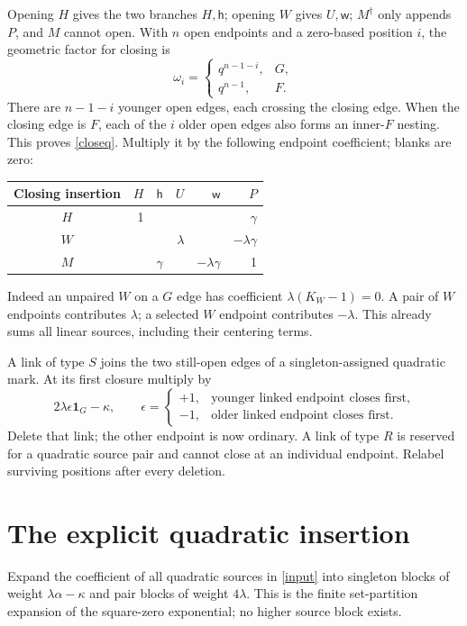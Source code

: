 \documentclass[11pt]{article}
\newcommand{\one}{\mathbf 1}
\begin{document}
Opening $H$ gives the two branches $H,\mathsf h$; opening $W$ gives
$U,\mathsf w$; $M^\dagger$ only appends $P$, and $M$ cannot open.
With $n$ open endpoints and a zero-based position $i$, the geometric
factor for closing is
\begin{equation}\label{closeq}
 \omega_i=\begin{cases}q^{n-1-i},&G,\\q^{n-1},&F.\end{cases}
\end{equation}
There are $n-1-i$ younger open edges, each crossing the closing edge.
When the closing edge is $F$, each of the $i$ older open edges also
forms an inner-$F$ nesting. This proves \eqref{closeq}.
Multiply it by the following endpoint coefficient; blanks are zero:
\begin{center}
\begin{tabular}{c|rrrrr}\toprule
Closing insertion&$H$&$\mathsf h$&$U$&$\mathsf w$&$P$\\\midrule
$H$&1&&&&$\gamma$\\
$W$&&&$\lambda$&&$-\lambda\gamma$\\
$M$&&$\gamma$&&$-\lambda\gamma$&1\\\bottomrule
\end{tabular}
\end{center}
Indeed an unpaired $W$ on a $G$ edge has coefficient
$\lambda(K_W-1)=0$. A pair of $W$ endpoints contributes $\lambda$;
a selected $W$ endpoint contributes $-\lambda$. This already sums
all linear sources, including their centering terms.

A link of type $S$ joins the two still-open edges of a singleton-assigned
quadratic mark. At its first closure multiply by
\begin{equation}\label{Sclose}
 2\lambda\epsilon\one_G-\kappa,\qquad
 \epsilon=\begin{cases}+1,&\text{younger linked endpoint closes first},\\
 -1,&\text{older linked endpoint closes first}.\end{cases}
\end{equation}
Delete that link; the other endpoint is now ordinary. A link of type
$R$ is reserved for a quadratic source pair and cannot close at an
individual endpoint. Relabel surviving positions after every deletion.

\newpage
\section{The explicit quadratic insertion}
Expand the coefficient of all quadratic sources in \eqref{input}
into singleton blocks of weight $\lambda\alpha-\kappa$ and pair blocks
of weight $4\lambda$. This is the finite set-partition expansion of
the square-zero exponential; no higher source block exists.
\end{document}
